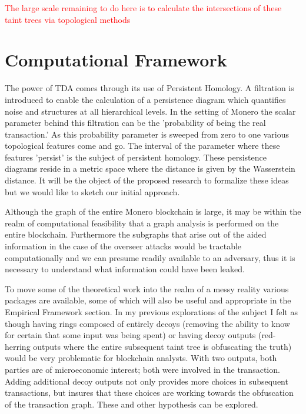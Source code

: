 \documentclass[prc, 12pt]{revtex4-1}
\begin{document}
\textcolor{red}{The large scale remaining to do here is to calculate the intersections of these taint trees via topological methods}
  
\section{Computational Framework}

The power of TDA comes through its use of Persistent Homology.  A filtration is introduced to enable the calculation of a persistence diagram which quantifies noise and structures at all hierarchical levels.  In the setting of Monero the scalar parameter behind this filtration can be the 'probability of being the real transaction.'   As this probability parameter is sweeped from zero to one various topological features come and go.  The interval of the parameter where these features 'persist' is the subject of persistent homology.  These persistence diagrams reside in a metric space where the distance is given by the Wasserstein distance. It will be the object of the proposed research to formalize these ideas but we would like to sketch our initial approach.

Although the graph of the entire Monero blockchain is large, it may be within the realm of computational feasibility that a graph analysis is performed on the entire blockchain.  Furthermore the subgraphs that arise out of the aided information in the case of the overseer attacks would be tractable computationally and we can presume readily available to an adversary, thus it is necessary to understand what information could have been leaked.  

To move some of the theoretical work into the realm of a messy reality various packages are available, some of which will also be useful and appropriate in the Empirical Framework section.   In my previous explorations of the subject I felt as though having rings composed of entirely decoys (removing the ability to know for certain that some input was being spent) or having decoy outputs (red-herring outputs where the entire subsequent taint tree is obfuscating the truth) would be very problematic for blockchain analysts.  With two outputs, both parties are of microeconomic interest; both were involved in the transaction.  Adding additional decoy outputs not only provides more choices in subsequent transactions, but insures that these choices are working towards the obfuscation of the transaction graph.  These and other hypothesis can be explored. 
\end{document}
